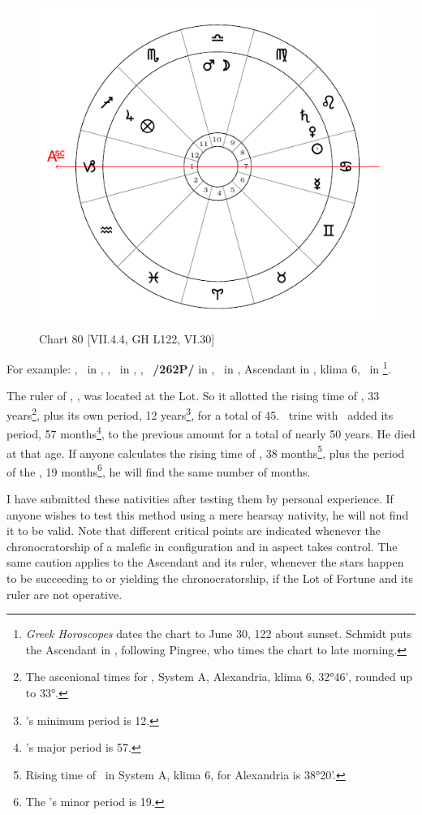 \newpage
\begin{figure}
\centering
\vspace{-10pt}
\includegraphics[width=.68\textwidth]{charts/7_4_4}
\caption{Chart 80 [VII.4.4, GH L122, VI.30]}
\label{fig:chart80}
\end{figure} 

For example: \Sun, \Mercury\, in \Cancer, \Moon, \Mars\, in \Libra, \Saturn, \Venus\, \textbf{/262P/} in \Leo, \Jupiter\, in \Sagittarius, Ascendant in \Capricorn, klima 6, \Fortune\, in \Sagittarius\footnote{\textit{Greek Horoscopes} dates the chart to June 30, 122 about sunset. Schmidt puts the Ascendant in \Virgo, following Pingree, who times the chart to late morning.}. 

The ruler of \Sagittarius, \Jupiter, was located at the Lot. So it allotted the rising time of \Sagittarius, 33 years\footnote{The ascenional times for \Sagittarius, System A, Alexandria, klima 6, 32°46', rounded up to 33°.}, plus its own period, 12 years\footnote{\Jupiter's minimum period is 12.}, for a total of 45. \Saturn\, trine with \Jupiter\, added its period, 57 months\footnote{\Saturn's major period is 57.}, to the previous amount for a total of nearly 50 years. He died at that age. If anyone calculates the rising time of \Leo, 38 months\footnote{Rising time of \Leo\, in System A, klima 6, for Alexandria is 38°20'. }, plus the period of the \Sun, 19 months\footnote{The \Sun's minor period is 19.}, he will find the same number of months.

I have submitted these nativities after testing them by personal experience. If anyone wishes to test this method using a mere hearsay nativity, he will not find it to be valid. Note \mndl that different critical points
are indicated whenever the chronocratorship of a malefic in configuration and in aspect takes control. The same caution applies to the Ascendant and its ruler, whenever the stars happen to be succeeding to or yielding the chronocratorship, if the Lot of Fortune and its ruler are not operative.

\newpage